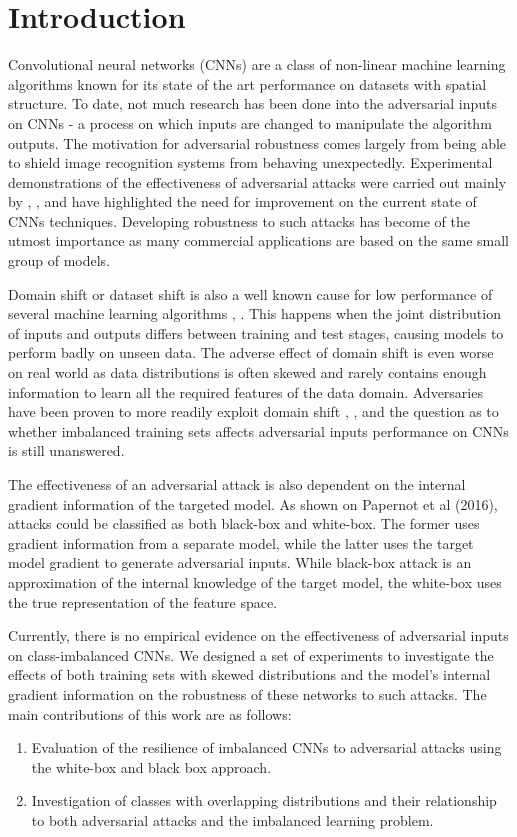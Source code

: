 \documentclass[runningheads,a4paper]{llncs}
\begin{document}
\section{Introduction}


Convolutional neural networks (CNNs) are a class of non-linear machine learning algorithms known for its state of the art performance on datasets with spatial structure. To date, not much research has been done into the adversarial inputs on CNNs - a process on which inputs are changed to manipulate the algorithm outputs. The motivation for adversarial robustness comes largely from being able to shield image recognition systems from behaving unexpectedly. Experimental demonstrations of the effectiveness of adversarial attacks were carried out mainly by \cite{billovits}, \cite{goodfellow2014}, \cite{papernot2016} and have highlighted the need for improvement on the current state of CNNs techniques. Developing robustness to such attacks has become of the utmost importance as many commercial applications are based on the same small group of models.

Domain shift or dataset shift \cite{Quionero} is also a well known cause for low performance of several machine learning algorithms \cite{japkowicz2002class}, \cite{krawczyk2016learning}. This happens when the joint distribution of inputs and outputs differs between training and test stages, causing models to perform badly on unseen data. The adverse effect of domain shift is even worse on real world as data distributions is often skewed and rarely contains enough information to learn all the required features of the data domain. Adversaries have been proven to more readily exploit domain shift \cite{Laskov2010}, \cite{lowd2005}, and the question as to whether imbalanced training sets affects adversarial inputs performance on CNNs is still unanswered. 

The effectiveness of an adversarial attack is also dependent on the internal gradient information of the targeted model. As shown on Papernot et al (2016), attacks could be classified as both black-box and white-box. The former uses gradient information from a separate model, while the latter uses the target model gradient to generate adversarial inputs. While black-box attack is an approximation of the internal knowledge of the target model, the white-box uses the true representation of the feature space.

Currently, there is no empirical evidence on the effectiveness of adversarial inputs on class-imbalanced CNNs. We designed a set of experiments to investigate the effects of both training sets with skewed distributions and the model's internal gradient information on the robustness of these networks to such attacks. The main contributions of this work are as follows: 
\begin{enumerate}
\item Evaluation of the resilience of imbalanced CNNs to adversarial attacks using the white-box and black box approach.
\item Investigation of classes with overlapping distributions and their relationship to both adversarial attacks and the imbalanced learning problem.
\end{enumerate}
\end{document}
